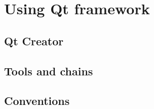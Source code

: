 \section{Using Qt framework}

\subsection{Qt Creator}

\subsection{Tools and chains}

\subsection{Conventions}
